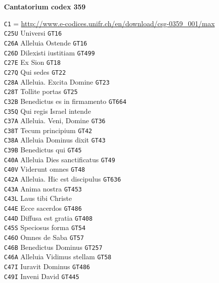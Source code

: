 \documentclass[a4paper]{article}
\begin{document}
{\footnotesize

\begin{multicols}{2}

\noindent\textbf{Cantatorium codex 359}

\noindent
\texttt{C1} = \url{http://www.e-codices.unifr.ch/en/download/csg-0359_001/max}\\
\texttt{C25U} Universi \texttt{GT16}\\
\texttt{C26A} Alleluia Ostende \texttt{GT16}\\
\texttt{C26D} Dilexisti iustitiam \texttt{GT499}\\
\texttt{C27E} Ex Sion \texttt{GT18}\\
\texttt{C27Q} Qui sedes \texttt{GT22}\\
\texttt{C28A} Alleluia. Excita Domine \texttt{GT23}\\
\texttt{C28T} Tollite portas \texttt{GT25}\\
\texttt{C32B} Benedictus es in firmamento \texttt{GT664}\\
\texttt{C35Q} Qui regis Israel intende\\
\texttt{C37A} Alleluia. Veni, Domine \texttt{GT36}\\
\texttt{C38T} Tecum principium \texttt{GT42}\\
\texttt{C38A} Alleluia Dominus dixit \texttt{GT43}\\
\texttt{C39B} Benedictus qui \texttt{GT45}\\
\texttt{C40A} Alleluia Dies sanctificatus \texttt{GT49}\\
\texttt{C40V} Viderunt omnes \texttt{GT48}\\
\texttt{C42A} Alleluia. Hic est discipulus \texttt{GT636}\\
\texttt{C43A} Anima nostra \texttt{GT453}\\
\texttt{C43L} Laus tibi Christe\\
\texttt{C44E} Ecce sacerdos \texttt{GT486}\\
\texttt{C44D} Diffusa est gratia \texttt{GT408}\\
\texttt{C45S} Speciosus forma \texttt{GT54}\\
\texttt{C46O} Omnes de Saba \texttt{GT57}\\
\texttt{C46B} Benedictus Dominus \texttt{GT257}\\
\texttt{C46A} Alleluia Vidimus stellam \texttt{GT58}\\
\texttt{C47I} Iuravit Dominus \texttt{GT486}\\
\texttt{C49I} Inveni David \texttt{GT445}\\

\end{multicols}}
\end{document}
